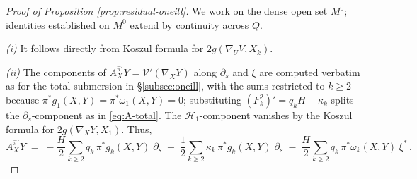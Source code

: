 \documentclass[11pt]{amsart}
\theoremstyle{plain}
\numberwithin{equation}{section}
\theoremstyle{definition}
\theoremstyle{remark}
\begin{document}
\begin{proof} [Proof of Proposition \ref{prop:residual-oneill}]
	We work on the dense open set $M^0$; %
	identities established on $M^0$ extend by continuity across $Q$.
	
	\emph{(i)} It follows directly from Koszul formula for $2g(\nabla_U V, X_k)$.  
	
	\emph{(ii)} The components of $A^{\widehat{\pi}'}_X Y = \mathcal{V}'(\nabla_X Y)$ along $\partial_s$ and $\xi$ are computed verbatim as for the total submersion in \S\ref{subsec:oneill}, with the sums restricted to $k \geq 2$ because $\pi^*g_1(X, Y) = \pi^*\omega_1(X, Y) = 0$; substituting $(F_k^2)' = q_k H + \kappa_k$ splits the $\partial_s$-component as in \eqref{eq:A-total}. The $\mathcal{H}_1$-component vanishes by the Koszul formula for $2g(\nabla_X Y, X_1)$. Thus,
	\begin{equation}\label{eq:A-residual-split}
			A^{\widehat{\pi}'}_X Y \;=\; -\frac{H}{2}\sum_{k \geq 2} q_k\,\pi^*g_k(X,Y)\;\partial_s \;-\; \frac{1}{2}\sum_{k \geq 2} \kappa_k\,\pi^*g_k(X,Y)\;\partial_s \;-\; \frac{H}{2}\sum_{k \geq 2} q_k\,\pi^*\omega_k(X,Y)\;\xi^* \, .
	\end{equation}
\end{proof}
\end{document}
